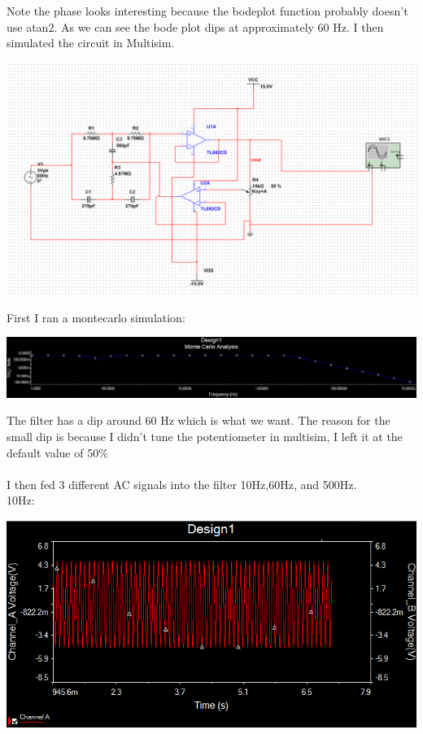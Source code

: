 \documentclass[12pt,letterpaper,boxed]{hmcpset}
\begin{document}
Note the phase looks interesting because the bodeplot function probably doesn't use atan2. As we can see the bode plot dips at approximately 60 Hz. I then simulated the circuit in Multisim.\begin{center}
\includegraphics[scale=.5]{Circuit}
\end{center}
First I ran a montecarlo simulation:
\begin{center}
\includegraphics[scale=1]{montecarlo}
\end{center}
The filter has a dip around 60 Hz which is what we want. The reason for the small dip is because I didn't tune the potentiometer in multisim, I left it at the default value of 50\%\\\\
I then fed 3 different AC signals into the filter 10Hz,60Hz, and 500Hz.\\
10Hz:
\begin{center}
\includegraphics[scale=1]{10Hz}
\end{center}
\end{document}
